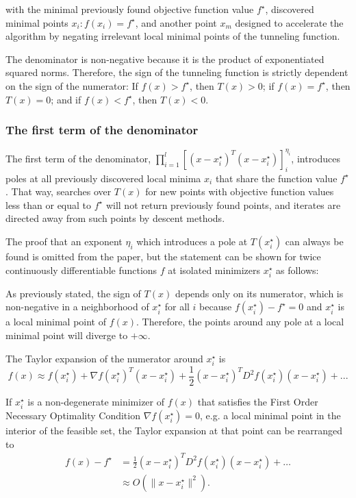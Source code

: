 \documentclass[a4paper,12pt,twoside]{article}
\begin{document}
with the minimal previously found objective function value $f^\star$, discovered minimal points $x_i: f(x_i) = f^\star$, and another point $x_m$ designed to accelerate the algorithm by negating irrelevant local minimal points of the tunneling function. 

The denominator is non-negative because it is the product of exponentiated squared norms. Therefore, the sign of the tunneling function is strictly dependent on the sign of the numerator: If $f(x) > f^\star$, then $T(x) > 0$; if $f(x) = f^\star$, then $T(x) = 0$; and if $f(x) < f^\star$, then $T(x) < 0$.

\subsubsection{The first term of the denominator}

The first term of the denominator, $\prod_{i = 1}^l [(x - x^\star_i)^T(x - x^\star_i)]^{\eta_i}_i$, introduces poles at all previously discovered local minima $x_i$ that share the function value $f^\star$. That way, searches over $T(x)$ for new points with objective function values less than or equal to $f^\star$ will not return previously found points, and iterates are directed away from such points by descent methods.

The proof that an exponent $\eta_i$ which introduces a pole at $T(x_i^\star)$ can always be found is omitted from the paper, but the statement can be shown for twice continuously differentiable functions $f$ at isolated minimizers $x_i^\star$ as follows:

As previously stated, the sign of $T(x)$ depends only on its numerator, which is non-negative in a neighborhood of $x_i^\star$ for all $i$ because $f(x_i^\star) - f^\star = 0$ and $x_i^\star$ is a local minimal point of $f(x)$. Therefore, the points around any pole at a local minimal point will diverge to $+\infty$.


The Taylor expansion of the numerator around $x_i^\star$ is  
\[
f(x) \approx f(x_i^\star) + \nabla f(x_i^\star)^T(x-x_i^\star) + \frac{1}{2}(x-x_i^\star)^T D^2f(x_i^\star)(x-x_i^\star) + ...
\]

If $x_i^ \star$ is a non-degenerate minimizer of $f(x)$ that satisfies the First Order Necessary Optimality Condition $\nabla f(x_i^\star) = 0$, e.g. a local minimal point in the interior of the feasible set, the Taylor expansion at that point \cite[Th. 2.1.30]{stein_basic_2024} can be rearranged to 
\begin{align*}
f(x) - f^\star &=  \frac{1}{2} (x-x_i^\star)^T D^2f(x_i^\star)(x-x_i^\star) + \dots  \\ 
&\approx O(\|x-x_i^\star\|^2).
\end{align*}
\end{document}

